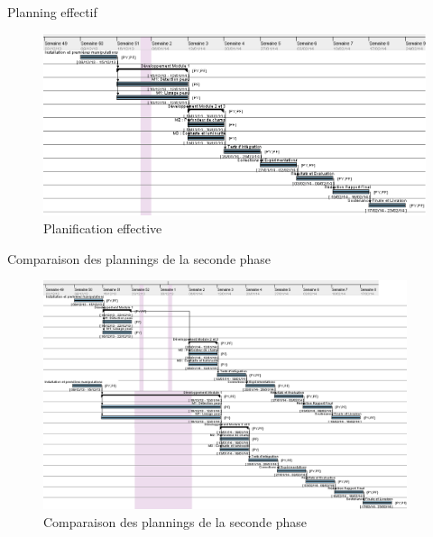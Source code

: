 \documentclass{beamer}
\begin{document}
\begin{frame}{Planning effectif}
\begin{figure}
	\centering
		\includegraphics[width=1\textwidth]{p2_effectif}
	\caption{Planification effective}
	\label{fig:PlanningEffectif}
\end{figure}

\end{frame}
\begin{frame}{Comparaison des plannings de la seconde phase}
\begin{figure}
	\centering
		\includegraphics[width=0.95\textwidth]{p2_previ_effe}
	\caption{Comparaison des plannings de la seconde phase}
	\label{fig:PlanningEffePrevi}
\end{figure}
\end{frame}



\end{document}
